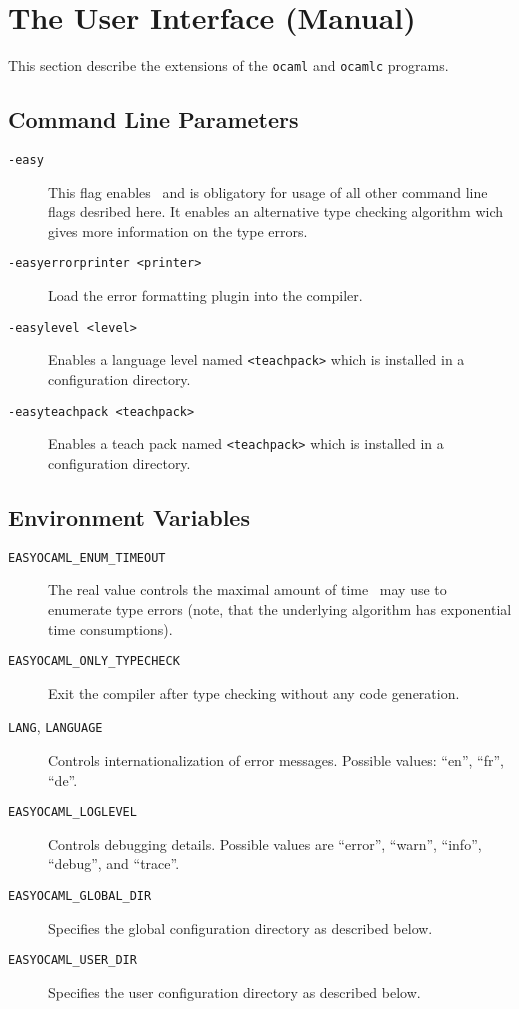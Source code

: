 
\section{The User Interface (Manual)}
\label{sec:manual}

This section describe the extensions of the \texttt{ocaml} and \texttt{ocamlc} programs.

\subsection{Command Line Parameters}
\label{sec:commandlineflags}

\begin{description}
  \item[\texttt{-easy}] This flag enables \easyocaml\ and is obligatory for
    usage of all other command line flags desribed here.
    It enables an alternative type checking algorithm wich gives more
    information on the type errors.
  \item[\texttt{-easyerrorprinter <printer>}] Load the error formatting plugin
    into the compiler.
  \item[\texttt{-easylevel <level>}] Enables a language level named
    \texttt{<teachpack>} which is installed in a configuration directory.
  \item[\texttt{-easyteachpack <teachpack>}] Enables a teach pack named
    \texttt{<teachpack>} which is installed in a configuration directory.
\end{description}

\subsection{Environment Variables}

\begin{description}
  \item[\texttt{EASYOCAML\_ENUM\_TIMEOUT}] \label{man:timeout}
    The real value controls the maximal amount of
    time \easyocaml\ may use to enumerate type errors (note, that the underlying algorithm
    has exponential time consumptions).
  \item[\texttt{EASYOCAML\_ONLY\_TYPECHECK}] Exit the compiler after type checking without any code generation.
  \item[\texttt{LANG}, \texttt{LANGUAGE}]  Controls internationalization of error messages. Possible
    values: ``en'', ``fr'', ``de''.
  \item[\texttt{EASYOCAML\_LOGLEVEL}] Controls debugging details. Possible values are ``error'', ``warn'', ``info'', ``debug'', and ``trace''.
  \item[\texttt{EASYOCAML\_GLOBAL\_DIR}] Specifies the global configuration directory as described below.
  \item[\texttt{EASYOCAML\_USER\_DIR}] Specifies the user configuration directory as described below.
\end{description}

